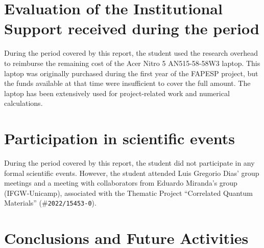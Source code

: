 \documentclass[12pt]{report}
\begin{document}
\chapter{Evaluation of the Institutional Support received during the period} \label{chp:apoioInst}

During the period covered by this report, the student used the research overhead to reimburse the remaining cost of the Acer Nitro 5 AN515-58-58W3 laptop. This laptop was originally purchased during the first year of the FAPESP project, but the funds available at that time were insufficient to cover the full amount. The laptop has been extensively used for project-related work and numerical calculations.



\chapter{Participation in scientific events} \label{chp:particEvento}

During the period covered by this report, the student did not participate in any formal scientific events. However, the student attended Luis Gregorio Dias' group meetings and a meeting with collaborators from Eduardo Miranda's group (IFGW-Unicamp), associated with the Thematic Project ``Correlated Quantum Materials'' (\#\texttt{2022/15453-0}).


\chapter{Conclusions and Future Activities} \label{chp:conclusions}
\end{document}
